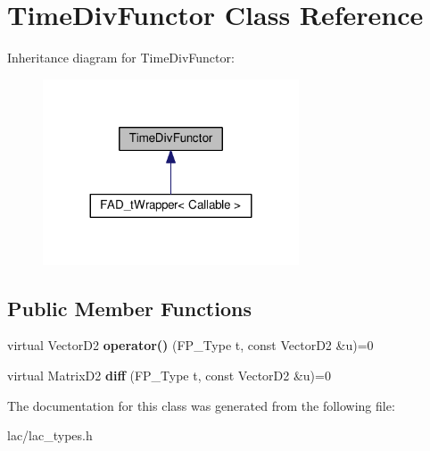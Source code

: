 \hypertarget{classTimeDivFunctor}{}\section{Time\+Div\+Functor Class Reference}
\label{classTimeDivFunctor}


Inheritance diagram for Time\+Div\+Functor\+:
\nopagebreak
\begin{figure}[H]
\begin{center}
\leavevmode
\includegraphics[width=215pt]{classTimeDivFunctor__inherit__graph}
\end{center}
\end{figure}
\subsection*{Public Member Functions}
\begin{DoxyCompactItemize}
\item 
\mbox{\label{classTimeDivFunctor_a0b58d98e0dae5315709b3e3037417d45}} 
virtual Vector\+D2 {\bfseries operator()} (F\+P\+\_\+\+Type t, const Vector\+D2 \&u)=0
\item 
\mbox{\label{classTimeDivFunctor_acbdba504a35a59e0b6687718b9d7d8ff}} 
virtual Matrix\+D2 {\bfseries diff} (F\+P\+\_\+\+Type t, const Vector\+D2 \&u)=0
\end{DoxyCompactItemize}


The documentation for this class was generated from the following file\+:\begin{DoxyCompactItemize}
\item 
lac/lac\+\_\+types.\+h\end{DoxyCompactItemize}
